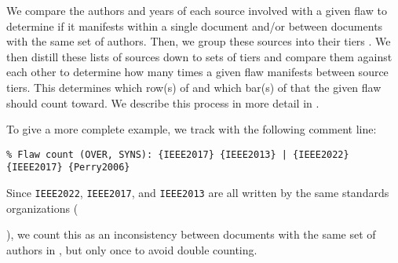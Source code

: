 We compare the authors and years of each source involved with a given flaw
to determine if it manifests within a single document and/or between documents
with the same set of authors. Then, we group these sources into their tiers
.
We then distill these lists of sources down to sets of tiers and compare them
against each other to determine how many times a given flaw manifests between
source tiers. This determines which row(s) of 
and which bar(s) of  that the given flaw should count toward.
We describe this process in more detail in .

To give a more complete example, we track  with the
following comment line:\utd{}
\begin{displayquote}
    \texttt{\% Flaw count (OVER, SYNS): \{IEEE2017\} \{IEEE2013\} | \{IEEE2022\}
        \displayNL{} \{IEEE2017\} \{Perry2006\}}
\end{displayquote}%
Since \texttt{IEEE2022}, \texttt{IEEE2017}, and \texttt{IEEE2013} are all
written by the same standards
organizations (\begin{NoHyper}\citeauthor{IEEE2022}\end{NoHyper}), we count
this as an inconsistency between documents with the same set of authors in
, but only once to avoid double counting.

